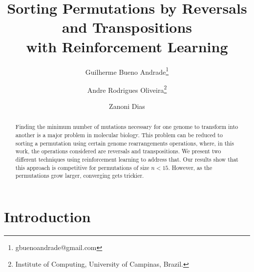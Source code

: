 \documentclass[11pt,twoside]{article}
\begin{document}


%



\TRMakeCover

\pagestyle{myheadings}

\title{Sorting Permutations by Reversals and Transpositions\\ with Reinforcement Learning}

\newcommand*\samethanks[1][\value{footnote}]{\footnotemark[#1]}
\author{Guilherme Bueno Andrade\thanks{gbuenoandrade@gmail.com} \and
Andre Rodrigues Oliveira\thanks{Institute of Computing, University of Campinas, Brazil.} \and Zanoni Dias\samethanks}

\date{}

\maketitle


\begin{abstract} 

Finding the minimum number of mutations necessary for one genome to transform into another is a major problem in molecular biology. This problem can be reduced to sorting a permutation using certain genome rearrangements operations, where, in this work, the operations considered are reversals and transpositions. We present two different techniques using reinforcement learning to address that. Our results show that this approach is competitive for permutations of size $n < 15$. However, as the permutations grow larger, converging gets trickier.

\end{abstract}

\section{Introduction}
\end{document}
